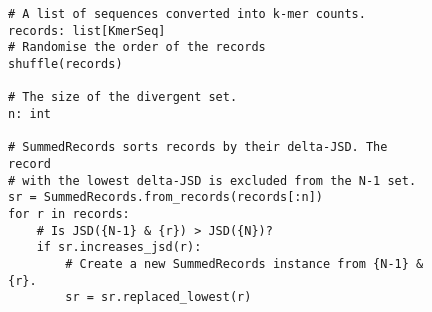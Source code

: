 \documentclass{article}
\begin{document}
\begin{figure}[h]
    \centering
        \begin{verbatim}
# A list of sequences converted into k-mer counts.
records: list[KmerSeq]
# Randomise the order of the records
shuffle(records)

# The size of the divergent set.
n: int

# SummedRecords sorts records by their delta-JSD. The record
# with the lowest delta-JSD is excluded from the N-1 set.
sr = SummedRecords.from_records(records[:n])
for r in records:
    # Is JSD({N-1} & {r}) > JSD({N})?
    if sr.increases_jsd(r):
        # Create a new SummedRecords instance from {N-1} & {r}.
        sr = sr.replaced_lowest(r)
        \end{verbatim}

\end{figure}
\end{document}
